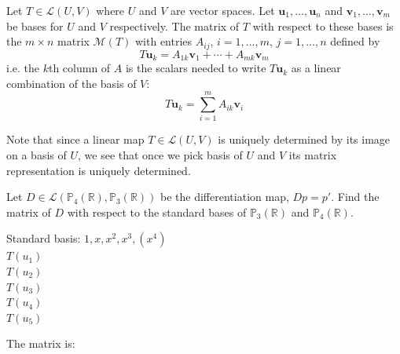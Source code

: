 \documentclass [aspectratio=169]{beamer}
\newcommand{\bu}{{\mathbf{u}}}
\newcommand{\bv}{{\mathbf{v}}}
\newcommand{\R}{{\mathbb{R}}}
\begin{document}
\begin{frame}
\begin{definition}\label{def:matrix_rep}
Let $T \in \mathcal{L}(U,V)$ where $U$ and $V$ are vector spaces. Let $\bu_1, \ldots, \bu_n$ and $\bv_1, \ldots, \bv_m$ be bases for $U$ and $V$ respectively. The matrix of $T$ with respect to these bases is the $m \times n$ matrix $\mathcal{M}(T)$ with entries $A_{ij}$, $i = 1, \ldots, m$, $j = 1, \ldots, n$ defined by
\begin{equation*}
    T\bu_k = A_{1k} \bv_1 + \cdots + A_{mk} \bv_m
\end{equation*}
i.e. the $k$th column of $A$ is the scalars needed to write $T \bu_k$ as a linear combination of the basis of $V$:
\begin{equation*}
    T \bu_k = \sum_{i=1}^m A_{ik} \bv_i 
\end{equation*}
\end{definition}

Note that since a linear map $T\in \mathcal{L}(U,V)$ is uniquely determined by its image on a basis of $U$, we see that once we pick basis of $U$ and $V$ its matrix representation is uniquely determined. 

\end{frame}




\begin{frame}
\begin{example}
Let $D \in \mathcal{L}(\mathbb{P}_4(\R),\mathbb{P}_3(\R))$ be the differentiation map, $Dp = p'$. Find the matrix of $D$ with respect to the standard bases of $\mathbb{P}_3(\R)$ and $\mathbb{P}_4(\R)$.

Standard basis: $1, x, x^2, x^3, (x^4)$ \\
$T(u_1) $ \\
$T(u_2)  $ \\ 
$T(u_3) $ \\ 
$T(u_4) $ \\
$T(u_5) $
\vspace{1em}

The matrix is:
\vspace{2cm}
\end{example}

\end{frame}
\end{document}
